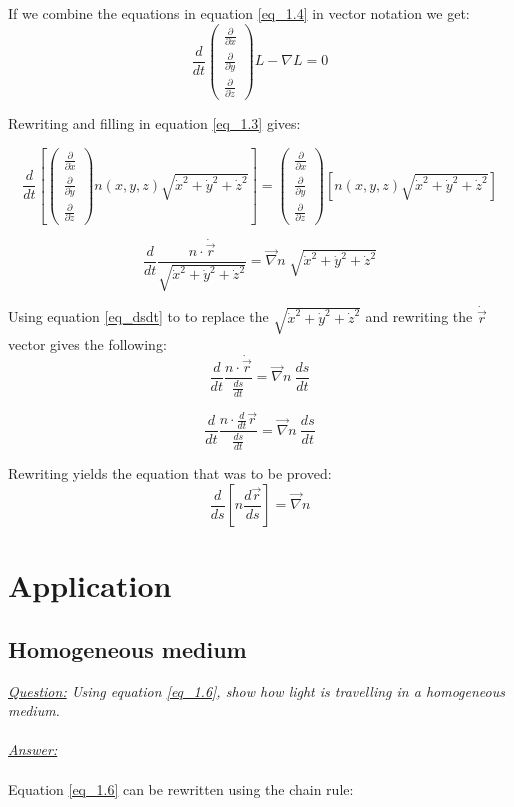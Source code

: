 \documentclass{article}
\def\Nabla{
	\begin{pmatrix}
		\frac{\partial}{\partial {x}} \\
		\frac{\partial}{\partial {y}} \\
		\frac{\partial}{\partial {z}}
	\end{pmatrix}}
\def\dNabla{
	\begin{pmatrix}
		\frac{\partial}{\partial \dot{x}} \\
		\frac{\partial}{\partial \dot{y}} \\
		\frac{\partial}{\partial \dot{z}}
	\end{pmatrix}}
\begin{document}
If we combine the equations in equation \ref{eq_1.4} in vector notation we get: \\

\begin{equation*}
	\frac{d}{dt} \dNabla L - \nabla L = 0
\end{equation*}

Rewriting and filling in equation \ref{eq_1.3} gives:

\begin{equation*}
	\frac{d}{dt} \left[ \dNabla n(x,y,z)\sqrt{\dot{x}^2+\dot{y}^2+\dot{z}^2} \right] = \Nabla \left[ n(x,y,z)\sqrt{\dot{x}^2+\dot{y}^2+\dot{z}^2} \right]
\end{equation*}

\begin{equation*}
	\frac{d}{dt}  \frac{n \cdot \dot{\vec{r}} }{\sqrt{\dot{x}^2+\dot{y}^2+\dot{z}^2}}   = \vec{\nabla} n \; \sqrt{\dot{x}^2+\dot{y}^2+\dot{z}^2}
\end{equation*}

Using equation \ref{eq_dsdt} to to replace the $\sqrt{\dot{x}^2+\dot{y}^2+\dot{z}^2}$ and rewriting the $\dot{\vec{r}}$ vector gives the following: \\

\begin{equation*}
	\frac{d}{dt} \frac{n \cdot \dot{\vec{r}}}{\frac{ds}{dt}}  = \vec{\nabla} n \: \frac{ds}{dt}
\end{equation*}

\begin{equation*}
	\frac{d}{dt}  \frac{n \cdot \frac{d}{dt} \vec{r}}{\frac{ds}{dt}}   =  \vec{\nabla} n \: \frac{ds}{dt}
\end{equation*}

Rewriting yields the equation that was to be proved: \\

\begin{equation*}
	\frac{d}{ds} \left[ n \frac{d \vec{r}}{ds} \right] = \vec{\nabla} n
\end{equation*}

\section{Application}
\subsection{Homogeneous medium}

\textit{\underline{Question:} Using equation \ref{eq_1.6}, show how light is travelling in a homogeneous medium.}\\
\\
\textit{\underline{Answer:}} \\
\\
Equation \ref{eq_1.6} can be rewritten using the chain rule: \\
\end{document}
